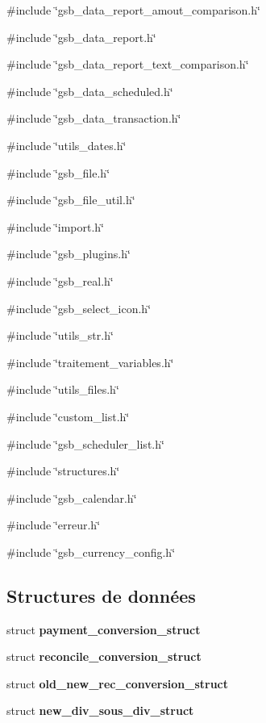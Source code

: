 {\ttfamily \#include \char`\"{}gsb\_\-data\_\-report\_\-amout\_\-comparison.h\char`\"{}}\par
{\ttfamily \#include \char`\"{}gsb\_\-data\_\-report.h\char`\"{}}\par
{\ttfamily \#include \char`\"{}gsb\_\-data\_\-report\_\-text\_\-comparison.h\char`\"{}}\par
{\ttfamily \#include \char`\"{}gsb\_\-data\_\-scheduled.h\char`\"{}}\par
{\ttfamily \#include \char`\"{}gsb\_\-data\_\-transaction.h\char`\"{}}\par
{\ttfamily \#include \char`\"{}utils\_\-dates.h\char`\"{}}\par
{\ttfamily \#include \char`\"{}gsb\_\-file.h\char`\"{}}\par
{\ttfamily \#include \char`\"{}gsb\_\-file\_\-util.h\char`\"{}}\par
{\ttfamily \#include \char`\"{}import.h\char`\"{}}\par
{\ttfamily \#include \char`\"{}gsb\_\-plugins.h\char`\"{}}\par
{\ttfamily \#include \char`\"{}gsb\_\-real.h\char`\"{}}\par
{\ttfamily \#include \char`\"{}gsb\_\-select\_\-icon.h\char`\"{}}\par
{\ttfamily \#include \char`\"{}utils\_\-str.h\char`\"{}}\par
{\ttfamily \#include \char`\"{}traitement\_\-variables.h\char`\"{}}\par
{\ttfamily \#include \char`\"{}utils\_\-files.h\char`\"{}}\par
{\ttfamily \#include \char`\"{}custom\_\-list.h\char`\"{}}\par
{\ttfamily \#include \char`\"{}gsb\_\-scheduler\_\-list.h\char`\"{}}\par
{\ttfamily \#include \char`\"{}structures.h\char`\"{}}\par
{\ttfamily \#include \char`\"{}gsb\_\-calendar.h\char`\"{}}\par
{\ttfamily \#include \char`\"{}erreur.h\char`\"{}}\par
{\ttfamily \#include \char`\"{}gsb\_\-currency\_\-config.h\char`\"{}}\par
\subsection*{Structures de données}
\begin{DoxyCompactItemize}
\item 
struct {\bf payment\_\-conversion\_\-struct}
\item 
struct {\bf reconcile\_\-conversion\_\-struct}
\item 
struct {\bf old\_\-new\_\-rec\_\-conversion\_\-struct}
\item 
struct {\bf new\_\-div\_\-sous\_\-div\_\-struct}
\end{DoxyCompactItemize}
